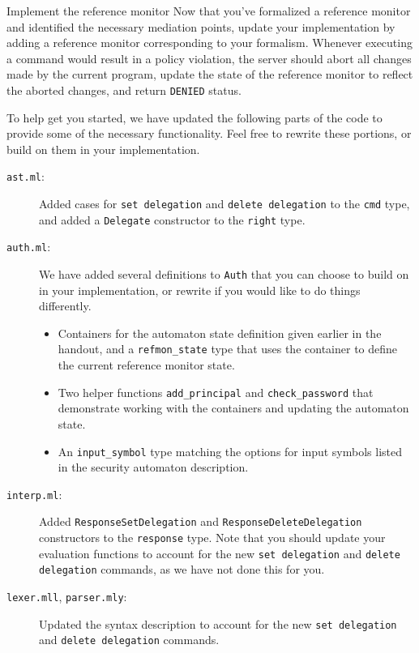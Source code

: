 \documentclass[11pt]{article}
\begin{document}
\newpage
\begin{problem}{Implement the reference monitor}
Now that you've formalized a reference monitor and identified the necessary mediation points, update your implementation by adding a reference monitor corresponding to your formalism.
Whenever executing a command would result in a policy violation, the server should abort all changes made by the current program, update the state of the reference monitor to reflect the aborted changes, and return \texttt{DENIED} status.

To help get you started, we have updated the following parts of the code to provide some of the necessary functionality. Feel free to rewrite these portions, or build on them in your implementation.
\begin{description}
\item[\texttt{ast.ml}:] Added cases for \texttt{set delegation} and \texttt{delete delegation} to the \texttt{cmd} type, and added a \texttt{Delegate} constructor to the \texttt{right} type.

\item[\texttt{auth.ml}:] We have added several definitions to \texttt{Auth} that you can choose to build on in your implementation, or rewrite if you would like to do things differently.
\begin{itemize}
\item Containers for the automaton state definition given earlier in the handout, and a \texttt{refmon\_state} type that uses the container to define the current reference monitor state.
\item Two helper functions \texttt{add\_principal} and \texttt{check\_password} that demonstrate working with the containers and updating the automaton state.
\item An \texttt{input\_symbol} type matching the options for input symbols listed in the security automaton description. 
\end{itemize}

\item[\texttt{interp.ml}:] Added \texttt{ResponseSetDelegation} and \texttt{ResponseDeleteDelegation} constructors to the \texttt{response} type. Note that you should update your evaluation functions to account for the new \texttt{set delegation} and \texttt{delete delegation} commands, as we have not done this for you.

\item[\texttt{lexer.mll}, \texttt{parser.mly}:] Updated the syntax description to account for the new \texttt{set delegation} and \texttt{delete delegation} commands.
\end{description}


\end{problem}
\end{document}
